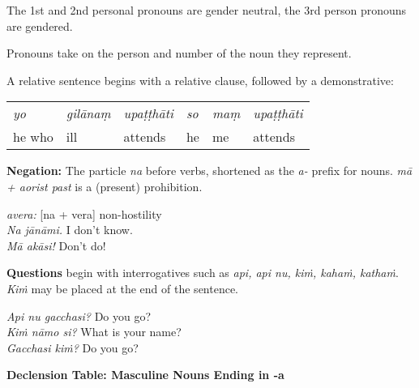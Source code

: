 \documentclass[11pt,oneside]{memoir}
\begin{document}
The 1st and 2nd personal pronouns are gender neutral, the 3rd person pronouns are gendered.

Pronouns take on the person and number of the noun they represent.

\clearpage

A relative sentence begins with a relative clause, followed by a demonstrative:

\begin{center}
\begin{tabular}{llllll}
\emph{yo} & \emph{gilānaṃ} & \emph{upaṭṭhāti} & \emph{so} & \emph{maṃ} & \emph{upaṭṭhāti}\\[0pt]
he who & ill & attends & he & me & attends\\[0pt]
\end{tabular}
\end{center}

\bigskip

\begin{multicols}{2}

\textbf{Negation:} The particle \emph{na} before verbs, shortened as the \emph{a-} prefix for
nouns. \emph{mā + aorist past} is a (present) prohibition.

\emph{avera:} [na + vera] non-hostility \\[0pt]
\emph{Na jānāmi.} I don't know. \\[0pt]
\emph{Mā akāsi!} Don't do!

\columnbreak

\textbf{Questions} begin with interrogatives such as \emph{api, api nu, kiṁ, kahaṁ, kathaṁ}.
\emph{Kiṁ} may be placed at the end of the sentence.

\emph{Api nu gacchasi?} Do you go?\\[0pt]
\emph{Kiṁ nāmo si?} What is your name?\\[0pt]
\emph{Gacchasi kiṁ?} Do you go?

\end{multicols}

\textbf{Declension Table: Masculine Nouns Ending in -a}
\end{document}
